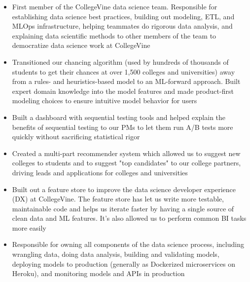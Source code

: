 \documentclass[10pt,a4paper,ragged2e,withhyper]{/Users/matt/documents/GitHub/mrkaye97.github.io/resume/altacv}
\begin{document}
	


	\makecvheader
		
	
		\begin{itemize}
		\item First member of the CollegeVine data science team. Responsible for establishing data science best practices, building out modeling, ETL, and MLOps infrastructure, helping teammates do rigorous data analysis, and explaining data scientific methods to other members of the team to democratize data science work at CollegeVine
		\item Transitioned our chancing algorithm (used by hundreds of thousands of students to get their chances at over 1,500 colleges and universities) away from a rules- and heuristics-based model to an ML-forward approach. Built expert domain knowledge into the model features and made product-first modeling choices to ensure intuitive model behavior for users
		\item Built a dashboard with sequential testing tools and helped explain the benefits of sequential testing to our PMs to let them run A/B tests more quickly without sacrificing statistical rigor
		\item Created a multi-part recommender system which allowed us to suggest new colleges to students and to suggest "top candidates" to our college partners, driving leads and applications for colleges and universities
		\item Built out a feature store to improve the data science developer experience (DX) at CollegeVine. The feature store has let us write more testable, maintainable code and helps us iterate faster by having a single source of clean data and ML features. It's also allowed us to perform common BI tasks more easily
		\item Responsible for owning all components of the data science process, including wrangling data, doing data analysis, building and validating models, deploying models to production (generally as Dockerized microservices on Heroku), and monitoring models and APIs in production
		\end{itemize}
		
		\divider
		
		
\end{document}
